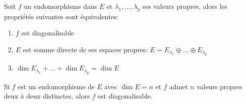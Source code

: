 \begin{theorem}
    Soit $f$ un endomorphisme dans  $E$ et  $\lambda_1, \ldots, \lambda_p$ ses valeurs propres, alors les propriétés suivantes sont équivalentes:
    \begin{enumerate}
        \item $f$ est diagonalisable
        \item  $E$ est somme directe de ses espaces propres:  $E = E_{\lambda_1} \oplus \ldots \oplus E_{\lambda_p}$
        \item $\dim E_{\lambda_1} + \ldots + \dim E_{\lambda_p} = \dim E$
    \end{enumerate}
\end{theorem}
\begin{corollary}
   Si $f$ est un endomorphisme de  $E$ avec  $\dim E = n$ et  $f$ admet  $n$ valeurs propres  deux à deux distinctes, alors $f$ est diagonalisable.
\end{corollary}

